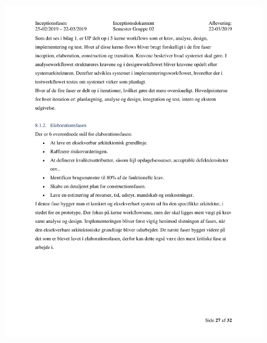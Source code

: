 \begin{figure}[hb]
  \includegraphics[scale = 0.33]{./PNG/Inceptions/Gruppe 02 + InceptionsDokument-28.jpg} 
\end{figure}

